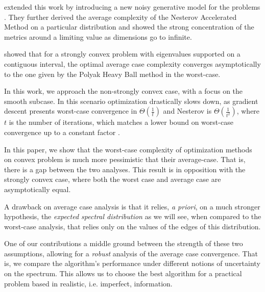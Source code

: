 \documentclass{article}
\begin{document}
\cite{paquette2020halting}  extended this work by introducing a new noisy generative model for the problems . They further derived the average complexity of the Nesterov Accelerated Method \cite{nesterov2003introductory} on a particular distribution and showed the strong concentration of the metrics around a limiting value as dimensions go to infinite. 


\cite{scieur2020universal} showed that for a strongly convex problem with eigenvalues supported on a contiguous interval, the optimal average case complexity converges asymptotically to the one given by the Polyak Heavy Ball method in the worst-case.  

In this work, we approach the non-strongly convex case, with a focus on the smooth subcase. In this scenario optimization drastically slows down, as gradient descent presents worst-case convergence in $\Theta(\frac{1}{t})$ and Nesterov is $\Theta(\frac{1}{t^2})$, where $t$ is the number of iterations, which matches a lower bound on worst-case convergence up to a constant factor \citep{nesterov2003introductory}. 


In this paper, we show that the worst-case complexity of optimization methods on convex problem is much more pessimistic that their average-case. That is, there is a gap between the two analyses. This result is in opposition with the strongly convex case, where both the worst case and average case are asymptotically equal.



A drawback on average case analysis is that it relies, \textit{a priori}, on a much stronger hypothesis,  the \textit{expected spectral distribution} as we will see, when compared to the worst-case analysis, that relies only on the values of the edges of this distribution. 

One of our contributions a middle ground between the strength of these two assumptions, allowing for a \emph{robust} analysis of the average case convergence. That is, we compare the algorithm's performance under different notions of uncertainty on the spectrum. This allows us  to choose the best algorithm for a practical problem based in realistic, i.e. imperfect, information.
\end{document}
